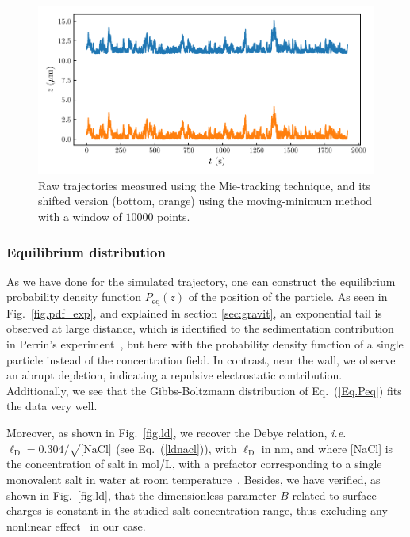 \begin{figure}[ht]
	\centering
	\includegraphics{02_body/chapter3/images/trajctory_analysis/traj_rescaled.pdf}
	\caption{Raw trajectories measured using the Mie-tracking technique, and its shifted version (bottom, orange) using the moving-minimum method with a window of $10000$ points.~\href{https://github.com/eXpensia/Confined-Brownian-Motion/blob/main/02_body/chapter3/images/trajctory_analysis/graph_ploting.ipynb}{\faGithub}} 
	\label{fig.rescaled_traj}
\end{figure}

\subsubsection{Equilibrium distribution}
\label{sec:Eqdistrib}

As we have done for the simulated trajectory, one can construct the equilibrium probability density function $P_\mathrm{eq}(z)$ of the position of the particle. As seen in Fig.~\ref{fig.pdf_exp}, and explained in section \ref{sec:gravit}, an exponential tail is observed at large distance, which is identified to the sedimentation contribution in Perrin's experiment~\cite{perrin_les_2014}, but here with the probability density function of a single particle instead of the concentration field. In contrast, near the wall, we observe an abrupt depletion, indicating a repulsive electrostatic contribution. Additionally, we see that the Gibbs-Boltzmann distribution of Eq.~(\ref{Eq.Peq}) fits the data very well.



Moreover, as shown in Fig.~\ref{fig.ld}, we recover the Debye relation, \textit{i.e.} $\ell_{\mathrm{D}}=0.304/\sqrt{\textrm{[NaCl]}}$ (see Eq.~(\ref{ldnacl})), with $\ell_{\mathrm{D}}$ in nm, and where [NaCl] is the concentration of salt in mol/L, with a prefactor corresponding to a single monovalent salt in water at room temperature~\cite{israelachvili_intermolecular_2015}. Besides, we have verified, as shown in Fig.~\ref{fig.ld}, that the dimensionless parameter $B$ related to surface charges is constant in the studied salt-concentration range, thus excluding any nonlinear effect~\cite{wang_measurement_2011,oberholzer_grand_1997} in our case. 

